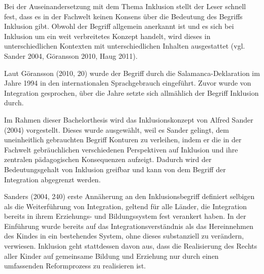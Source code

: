 Bei der Auseinandersetzung mit dem Thema Inklusion stellt der Leser schnell fest, dass es in der Fachwelt keinen Konsens über die Bedeutung des Begriffs Inklusion gibt. Obwohl der Begriff allgemein anerkannt ist und es sich bei Inklusion um ein weit verbreitetes Konzept handelt, wird dieses in unterschiedlichen Kontexten mit unterschiedlichen Inhalten ausgestattet (vgl. Sander 2004, Göransson 2010, Haug 2011). 

Laut Göransson (2010, 20) wurde der Begriff durch die Salamanca-Deklaration im Jahre 1994 in den internationalen Sprachgebrauch eingeführt. Zuvor wurde von Integration gesprochen, über die Jahre setzte sich allmählich der Begriff Inklusion durch.

Im Rahmen dieser Bachelorthesis wird das Inklusionskonzept von Alfred Sander (2004) vorgestellt. Dieses wurde ausgewählt, weil es Sander gelingt, dem uneinheitlich gebrauchten Begriff Konturen zu verleihen, indem er die in der Fachwelt gebräuchlichen verschiedenen Perspektiven auf Inklusion und ihre zentralen pädagogischen Konsequenzen aufzeigt. Dadurch wird der Bedeutungsgehalt von Inklusion greifbar und kann von dem Begriff der Integration abgegrenzt werden.

Sanders (2004, 240) erste Annäherung an den Inklusionsbegriff  definiert selbigen als die Weiterführung von Integration, geltend für alle Länder, die Integration bereits in ihrem Erziehungs- und Bildungssystem fest verankert haben. In der Einführung wurde bereits auf das Integrationsverständnis als das Hereinnehmen des Kindes in ein bestehendes System, ohne dieses substanziell zu verändern, verwiesen. Inklusion geht stattdessen davon aus, dass die Realisierung des Rechts aller Kinder auf gemeinsame Bildung und Erziehung nur durch einen umfassenden Reformprozess zu realisieren ist.
 
